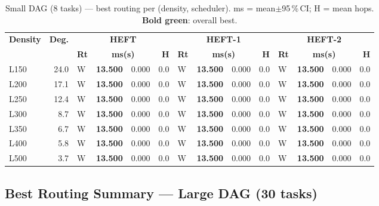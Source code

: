 \documentclass[11pt]{article}
\newcommand{\win}[1]{\textcolor{green!50!black}{\textbf{#1}}}
\begin{document}
\begin{table}[H]\centering\small
\begin{tabular}{l r l r@{$\pm$}l r l r@{$\pm$}l r l r@{$\pm$}l r}
\toprule
\textbf{Density} & \textbf{Deg.} & \multicolumn{4}{c}{\textbf{HEFT}} & \multicolumn{4}{c}{\textbf{HEFT-1}} & \multicolumn{4}{c}{\textbf{HEFT-2}} \\
\cmidrule(lr){3-6}\cmidrule(lr){7-10}\cmidrule(lr){11-14}
& & \textbf{Rt} & \multicolumn{2}{c}{\textbf{ms(s)}} & \textbf{H} & \textbf{Rt} & \multicolumn{2}{c}{\textbf{ms(s)}} & \textbf{H} & \textbf{Rt} & \multicolumn{2}{c}{\textbf{ms(s)}} & \textbf{H} \\
\midrule
  L150 & 24.0 & W & \win{13.500} & 0.000 & 0.0 & W & \win{13.500} & 0.000 & 0.0 & W & \win{13.500} & 0.000 & 0.0 \\
  L200 & 17.1 & W & \win{13.500} & 0.000 & 0.0 & W & \win{13.500} & 0.000 & 0.0 & W & \win{13.500} & 0.000 & 0.0 \\
  L250 & 12.4 & W & \win{13.500} & 0.000 & 0.0 & W & \win{13.500} & 0.000 & 0.0 & W & \win{13.500} & 0.000 & 0.0 \\
  L300 & 8.7 & W & \win{13.500} & 0.000 & 0.0 & W & \win{13.500} & 0.000 & 0.0 & W & \win{13.500} & 0.000 & 0.0 \\
  L350 & 6.7 & W & \win{13.500} & 0.000 & 0.0 & W & \win{13.500} & 0.000 & 0.0 & W & \win{13.500} & 0.000 & 0.0 \\
  L400 & 5.8 & W & \win{13.500} & 0.000 & 0.0 & W & \win{13.500} & 0.000 & 0.0 & W & \win{13.500} & 0.000 & 0.0 \\
  L500 & 3.7 & W & \win{13.500} & 0.000 & 0.0 & W & \win{13.500} & 0.000 & 0.0 & W & \win{13.500} & 0.000 & 0.0 \\
\bottomrule\end{tabular}
\caption{Small DAG (8 tasks) --- best routing per (density, scheduler). ms = mean$\pm$95\,\%\,CI; H = mean hops. \win{Bold green}: overall best.}
\end{table}

\subsection{Best Routing Summary --- Large DAG (30 tasks)}
\end{document}
